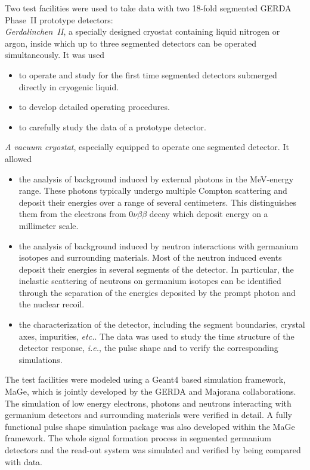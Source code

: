 Two test facilities were used to take data with two 18-fold segmented
GERDA Phase~II prototype detectors:\\
\emph{Gerdalinchen~II}, a specially designed cryostat containing
liquid nitrogen or argon, inside which up to three segmented detectors
can be operated simultaneously. It was used
\begin{itemize}
\item to operate and study for the first time segmented detectors
submerged directly in cryogenic liquid.
\item to develop detailed operating procedures.
\item to carefully study the data of a prototype detector.
\end{itemize}
\emph{A vacuum cryostat}, especially equipped to operate one segmented
detector. It allowed
\begin{itemize}
\item the analysis of background induced by external photons in the
MeV-energy range. These photons typically undergo multiple Compton
scattering and deposit their energies over a range of several
centimeters. This distinguishes them from the electrons from
$0\nu\beta\beta$ decay which deposit energy on a millimeter scale.
\item the analysis of background induced by neutron interactions with
germanium isotopes and surrounding materials. Most of the neutron
induced events deposit their energies in several segments of the
detector. In particular, the inelastic scattering of neutrons on
germanium isotopes can be identified through the separation of the
energies deposited by the prompt photon and the nuclear recoil.
\item the characterization of the detector, including the segment
boundaries, crystal axes, impurities, \textit{etc.}. The data was used
to study the time structure of the detector response, \textit{i.e.},
the pulse shape and to verify the corresponding simulations.
\end{itemize}

The test facilities were modeled using a Geant4 based simulation
framework, MaGe, which is jointly developed by the GERDA and Majorana
collaborations. The simulation of low energy electrons, photons and
neutrons interacting with germanium detectors and surrounding
materials were verified in detail. A fully functional pulse shape
simulation package was also developed within the MaGe framework. The
whole signal formation process in segmented germanium detectors and
the read-out system was simulated and verified by being compared with
data.

